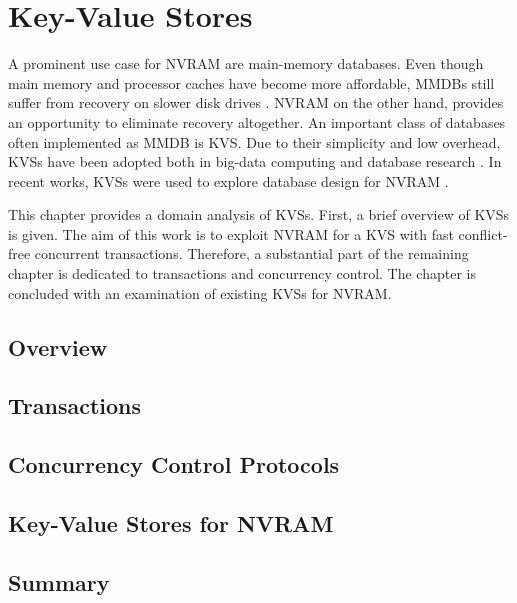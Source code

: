 \chapter{Key-Value Stores}
\label{ch:kvs}

A prominent use case for \ac{NVRAM} are main-memory databases. Even though main
memory and processor caches have become more affordable, \acp{MMDB} still suffer
from recovery on slower disk drives \cite{oukid2015instant, schwalb2016hyrise}.
\ac{NVRAM} on the other hand, provides an opportunity to eliminate recovery
altogether. An important class of databases often implemented as \ac{MMDB} is
\ac{KVS}. Due to their simplicity and low overhead, \acp{KVS} have been adopted
both in big-data computing and database research \cite{decandia2007dynamo,
lakshman2010cassandra, wang2015hydradb}. In recent works, \acp{KVS} were used to
explore database design for \ac{NVRAM} \cite{bailey2013exploring, zhou2016nvht,
wu2016nvmcached}.

This chapter provides a domain analysis of \acp{KVS}. First, a brief overview of
\acp{KVS} is given. The aim of this work is to exploit \ac{NVRAM} for a \ac{KVS}
with fast conflict-free concurrent transactions. Therefore, a substantial part
of the remaining chapter is dedicated to transactions and concurrency control.
The chapter is concluded with an examination of existing \acp{KVS} for
\ac{NVRAM}.

\section{Overview}
\label{ch:kvs-overview}


\section{Transactions}
\label{ch:kvs-tx}


\section{Concurrency Control Protocols}
\label{ch:kvs-cc}


\section{Key-Value Stores for NVRAM}
\label{ch:kvs-nvram}


\section{Summary}
\label{ch:kvs-summary}

